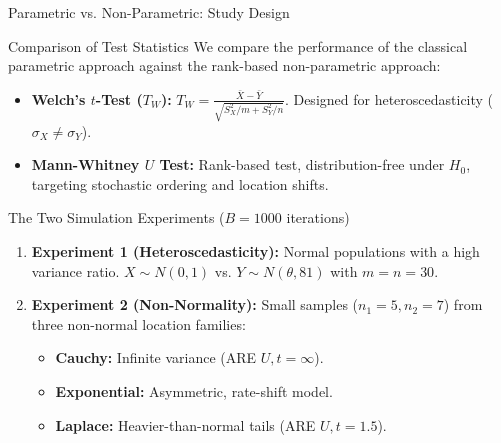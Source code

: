 \documentclass[8pt]{beamer}
\begin{document}
\begin{frame}{Parametric vs. Non-Parametric: Study Design}
    \footnotesize
    \begin{block}{Comparison of Test Statistics}
        We compare the performance of the classical parametric approach against the rank-based non-parametric approach:
        \begin{itemize}
            \item \textbf{Welch's $t$-Test ($T_W$):} $T_W = \frac{\bar{X} - \bar{Y}}{\sqrt{S_X^2/m + S_Y^2/n}}$. Designed for heteroscedasticity ($\sigma_X \neq \sigma_Y$).
            \item \textbf{Mann-Whitney $U$ Test:} Rank-based test, distribution-free under $H_0$, targeting stochastic ordering and location shifts.
        \end{itemize}
    \end{block}

    \begin{block}{The Two Simulation Experiments ($B=1000$ iterations)}
        \begin{enumerate}
            \item \textbf{Experiment 1 (Heteroscedasticity):} Normal populations with a high variance ratio. $X \sim N(0,1)$ vs. $Y \sim N(\theta, 81)$ with $m=n=30$.
            \item \textbf{Experiment 2 (Non-Normality):} Small samples ($n_1=5, n_2=7$) from three non-normal location families:
                \begin{itemize}
                    \item \textbf{Cauchy:} Infinite variance (ARE $U,t = \infty$).
                    \item \textbf{Exponential:} Asymmetric, rate-shift model.
                    \item \textbf{Laplace:} Heavier-than-normal tails (ARE $U,t = 1.5$).
                \end{itemize}
        \end{enumerate}
    \end{block}
\end{frame}
\end{document}
